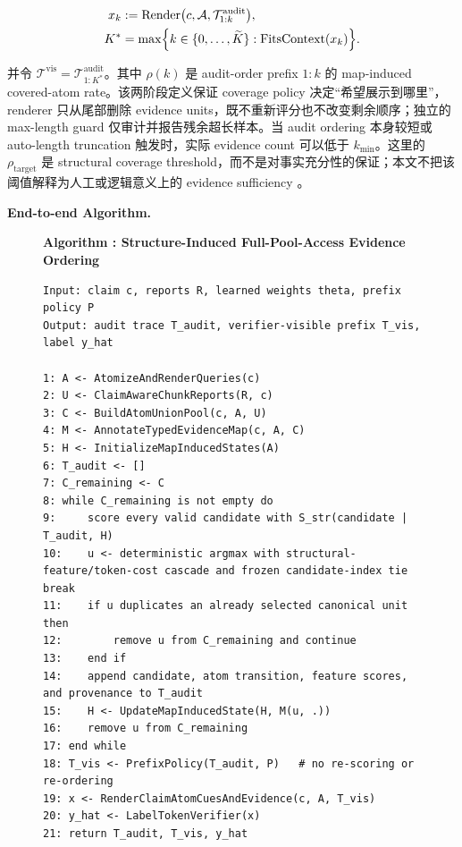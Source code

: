 \documentclass[letterpaper]{article}
\newcounter{paperalgorithm}
\begin{document}
\[
\begin{aligned}
x_k&:=\operatorname{Render}
\bigl(c,\mathcal A,\mathcal T_{1:k}^{\mathrm{audit}}\bigr),\\
K^\ast&=\max\Bigl\{k\in\{0,\ldots,\widetilde K\}:
\operatorname{FitsContext}(x_k)\Bigr\}.
\end{aligned}
\]

并令 $\mathcal T^{\mathrm{vis}}=\mathcal T_{1:K^\ast}^{\mathrm{audit}}$。其中 $\rho(k)$ 是 audit-order prefix $1{:}k$ 的 map-induced covered-atom rate。该两阶段定义保证 coverage policy 决定“希望展示到哪里”，renderer 只从尾部删除 evidence units，既不重新评分也不改变剩余顺序；独立的 max-length guard 仅审计并报告残余超长样本。当 audit ordering 本身较短或 auto-length truncation 触发时，实际 evidence count 可以低于 $k_{\min}$。这里的 $\rho_{\mathrm{target}}$ 是 structural coverage threshold，而不是对事实充分性的保证；本文不把该阈值解释为人工或逻辑意义上的 evidence sufficiency \citep{Atanasova2022Insufficient,Alt2026EvidenceRanking}。

\textbf{End-to-end Algorithm.}

\begin{figure}[t]
\label{alg:full-pool-ordering}
\begin{center}
\textbf{Algorithm \thepaperalgorithm: Structure-Induced Full-Pool-Access Evidence Ordering}
\end{center}
\begin{lstlisting}
Input: claim c, reports R, learned weights theta, prefix policy P
Output: audit trace T_audit, verifier-visible prefix T_vis, label y_hat

1: A <- AtomizeAndRenderQueries(c)
2: U <- ClaimAwareChunkReports(R, c)
3: C <- BuildAtomUnionPool(c, A, U)
4: M <- AnnotateTypedEvidenceMap(c, A, C)
5: H <- InitializeMapInducedStates(A)
6: T_audit <- []
7: C_remaining <- C
8: while C_remaining is not empty do
9:     score every valid candidate with S_str(candidate | T_audit, H)
10:    u <- deterministic argmax with structural-feature/token-cost cascade and frozen candidate-index tie break
11:    if u duplicates an already selected canonical unit then
12:        remove u from C_remaining and continue
13:    end if
14:    append candidate, atom transition, feature scores, and provenance to T_audit
15:    H <- UpdateMapInducedState(H, M(u, .))
16:    remove u from C_remaining
17: end while
18: T_vis <- PrefixPolicy(T_audit, P)   # no re-scoring or re-ordering
19: x <- RenderClaimAtomCuesAndEvidence(c, A, T_vis)
20: y_hat <- LabelTokenVerifier(x)
21: return T_audit, T_vis, y_hat
\end{lstlisting}
\end{figure}
\end{document}
